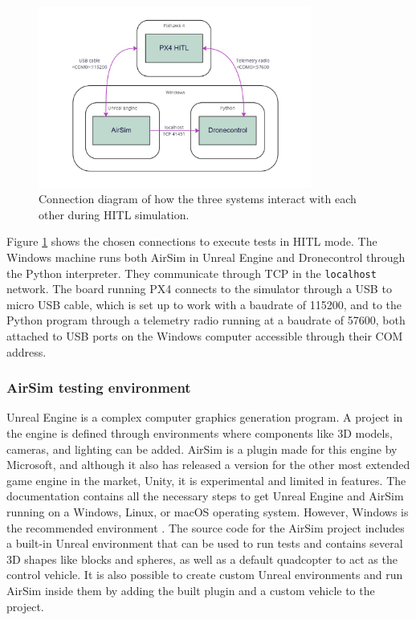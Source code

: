 \begin{figure}
  \centering
  \includegraphics[width=0.8\textwidth,keepaspectratio]{img/hitl-connections.jpg}
  \caption{Connection diagram of how the three systems interact with each other during HITL simulation.}\label{fig:hitl-connections}
\end{figure}

Figure \ref{fig:hitl-connections} shows the chosen connections to execute tests in HITL mode.
The Windows machine runs both AirSim in Unreal Engine and Dronecontrol through the Python interpreter.
They communicate through TCP in the \texttt{localhost} network.
The board running PX4 connects to the simulator through a USB to micro USB cable, which is set up to work with a baudrate of 115200, and to the Python program through a telemetry radio running at a baudrate of 57600, both attached to USB ports on the Windows computer accessible through their COM address.

\subsubsection{AirSim testing environment}

Unreal Engine is a complex computer graphics generation program.
A project in the engine is defined through environments where components like 3D models, cameras, and lighting can be added.
AirSim is a plugin made for this engine by Microsoft, and although it also has released a version for the other most extended game engine in the market, Unity, it is experimental and limited in features.
The documentation contains all the necessary steps to get Unreal Engine and AirSim running on a Windows, Linux, or macOS operating system. 
However, Windows is the recommended environment \cite{build-airsim}.
The source code for the AirSim project includes a built-in Unreal environment that can be used to run tests and contains several 3D shapes like blocks and spheres, as well as a default quadcopter to act as the control vehicle.
It is also possible to create custom Unreal environments and run AirSim inside them by adding the built plugin and a custom vehicle to the project.

